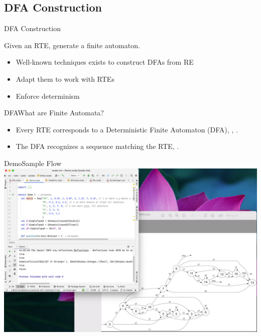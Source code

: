 \subsection{DFA Construction}

{  
\begin{frame}{ DFA Construction}

  Given an RTE, generate a finite automaton.

  \begin{itemize}
  \item Well-known techniques exists to construct DFAs from RE
  \item Adapt them to work with RTEs
  \item Enforce determinism
  \end{itemize}
\end{frame}

}

\begin{frame}{DFA}{What are Finite Automata?}
  \scalebox{0.75}{}
  \begin{itemize}
  \item   Every RTE corresponds to a Deterministic Finite Automaton (DFA), , .

  \item   The DFA recognizes a sequence matching the RTE, .

  \end{itemize}
\end{frame}



\begin{frame}{Demo}{Sample Flow}
  \centering
   \includegraphics[height=0.8\textheight]{demo.png}
\end{frame}


